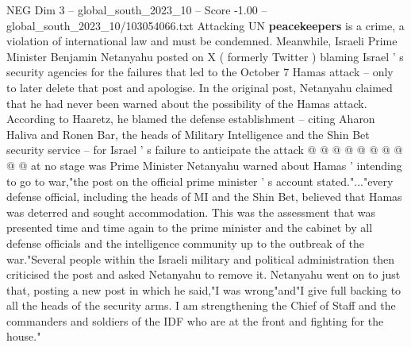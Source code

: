 \begin{textsample}{NEG Dim 3 – global\_south\_2023\_10 – Score -1.00 – global\_south\_2023\_10/103054066.txt}
Attacking UN \textbf{peacekeepers} is a crime, a violation of international law and must be condemned.
Meanwhile, Israeli Prime Minister Benjamin Netanyahu posted on X ( formerly Twitter ) blaming Israel ' s security agencies for the failures that led to the October 7 Hamas attack -- only to later delete that post and apologise.
In the original post, Netanyahu claimed that he had never been warned about the possibility of the Hamas attack.
According to Haaretz, he blamed the defense establishment -- citing Aharon Haliva and Ronen Bar, the heads of Military Intelligence and the Shin Bet security service -- for Israel ' s failure to anticipate the attack @ @ @ @ @ @ @ @ @ @ at no stage was Prime Minister Netanyahu warned about Hamas ' intending to go to war,"the post on the official prime minister ' s account stated."..."every defense official, including the heads of MI and the Shin Bet, believed that Hamas was deterred and sought accommodation.
This was the assessment that was presented time and time again to the prime minister and the cabinet by all defense officials and the intelligence community up to the outbreak of the war."Several people within the Israeli military and political administration then criticised the post and asked Netanyahu to remove it.
Netanyahu went on to just that, posting a new post in which he said,"I was wrong"and"I give full backing to all the heads of the security arms.
I am strengthening the Chief of Staff and the commanders and soldiers of the IDF who are at the front and fighting for the house."

\end{textsample}
